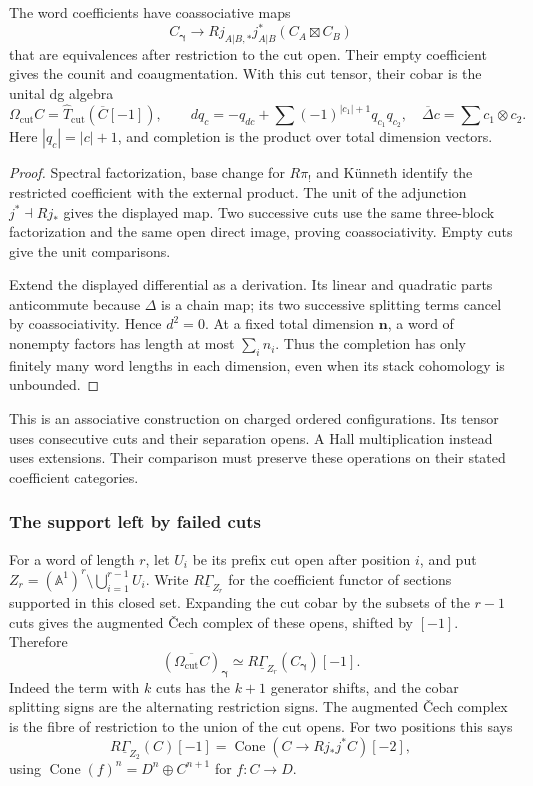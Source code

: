 \begin{theorem}
\label{hall:thm:spectral-cut}
The word coefficients have coassociative maps
\[
 C_{\boldsymbol\gamma}\longrightarrow
 Rj_{A|B,*}j_{A|B}^*(C_A\boxtimes C_B)
\]
that are equivalences after restriction to the cut open. Their
empty coefficient gives the counit and coaugmentation. With this
cut tensor, their cobar is the unital dg algebra
\[
 \Omega_{\mathrm{cut}}C
 =\widehat T_{\mathrm{cut}}(\overline C[-1]),\qquad
 d q_c=-q_{dc}+\sum(-1)^{|c_1|+1}q_{c_1}q_{c_2},
 \quad\overline\Delta c=\sum c_1\otimes c_2.
\]
Here $|q_c|=|c|+1$, and completion is the product over total
dimension vectors.
\end{theorem}

\begin{proof}
Spectral factorization, base change for $R\pi_!$ and K\"unneth
identify the restricted coefficient with the external product.
The unit of the adjunction $j^*\dashv Rj_*$ gives the displayed
map. Two successive cuts use the same three-block factorization
and the same open direct image, proving coassociativity.
Empty cuts give the unit comparisons.

Extend the displayed differential as a derivation. Its linear
and quadratic parts anticommute because $\Delta$ is a chain map;
its two successive splitting terms cancel by coassociativity.
Hence $d^2=0$. At a fixed total dimension $\mathbf n$, a word
of nonempty factors has length at most $\sum_i n_i$. Thus the
completion has only finitely many word lengths in each dimension,
even when its stack cohomology is unbounded.
\end{proof}

This is an associative construction on charged ordered
configurations. Its tensor uses consecutive cuts and their
separation opens. A Hall multiplication instead uses extensions.
Their comparison must preserve these operations on their stated
coefficient categories.

\subsubsection*{The support left by failed cuts}

For a word of length $r$, let $U_i$ be its prefix cut open after
position $i$, and put
$Z_r=(\mathbb A^1)^r\setminus\bigcup_{i=1}^{r-1}U_i$.
Write $R\underline\Gamma_{Z_r}$ for the coefficient functor
of sections supported in this closed set. Expanding the cut
cobar by the subsets of the $r-1$ cuts gives the augmented
\v Cech complex of these opens, shifted by $[-1]$. Therefore
\begin{equation}
\label{hall:eq:cut-support}
 (\overline{\Omega_{\mathrm{cut}}C})_{\boldsymbol\gamma}
 \simeq R\underline\Gamma_{Z_r}(C_{\boldsymbol\gamma})[-1].
\end{equation}
Indeed the term with $k$ cuts has the $k+1$ generator shifts,
and the cobar splitting signs are the alternating restriction
signs. The augmented \v Cech complex is the fibre of restriction
to the union of the cut opens. For two positions this says
\[
 R\underline\Gamma_{Z_2}(C)[-1]
 =\operatorname{Cone}(C\longrightarrow Rj_*j^*C)[-2],
\]
using $\operatorname{Cone}(f)^n=D^n\oplus C^{n+1}$ for
$f:C\to D$.

